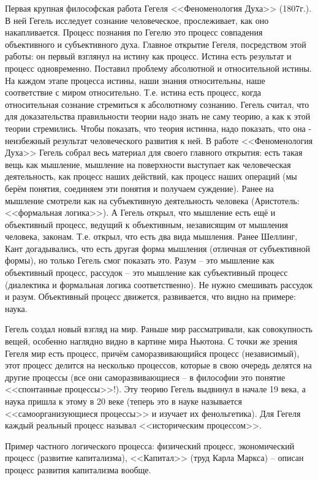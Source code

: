 Первая крупная философская работа Гегеля <<Феноменология Духа>> (1807г.). В ней Гегель исследует сознание человеческое, прослеживает, как оно накапливается. Процесс познания по Гегелю это процесс совпадения объективного и субъективного духа. Главное открытие Гегеля, посредством этой работы: он первый взглянул на истину как процесс. Истина есть результат и процесс одновременно. Поставил проблему абсолютной и относительной истины. На каждом этапе процесса истины, наши знания относительны, наше соответствие с миром относительно. Т.е. истина есть процесс, когда относительная сознание стремиться к абсолютному сознанию. Гегель считал, что для доказательства правильности теории надо знать не саму теорию, а как к этой теории стремились. Чтобы показать, что теория истинна, надо показать, что она - неизбежный результат человеческого развития к ней. В работе <<Феноменология Духа>> Гегель собрал весь материал для своего главного открытия: есть такая вещь как мышление, мышление на поверхности выступает как человеческая деятельность, как процесс наших действий, как процесс наших операций (мы берём понятия, соединяем эти понятия и получаем суждение). Ранее на мышление смотрели как на субъективную деятельность человека (Аристотель: <<формальная логика>>). А Гегель открыл, что мышление есть ещё и объективный процесс, ведущий к объективным, независящим от мышления человека, законам. Т.е. открыл, что есть два вида мышления. Ранее Шеллинг, Кант догадывались, что есть другая форма мышления (отличная от субъективной формы), но только Гегель смог показать это. Разум – это мышление как объективный процесс, рассудок – это мышление как субъективный процесс (диалектика и формальная логика соответственно). Не нужно смешивать рассудок и разум. Объективный процесс движется, развивается, что видно на примере: наука.

Гегель создал новый взгляд на мир. Раньше мир рассматривали, как совокупность вещей, особенно наглядно видно в картине мира Ньютона. С точки же зрения Гегеля мир есть процесс, причём саморазвивающийся процесс (независимый), этот процесс делится на несколько процессов, которые в свою очередь делятся на другие процессы (все они саморазвивающиеся – в философии это понятие <<спонтанные процессы>>!). Эту теорию Гегель выдвинул в начале 19 века, а наука пришла к этому в 20 веке (теперь это в науке называется <<самоорганизующиеся процессы>> и изучает их фенольгетика). Для Гегеля каждый реальный процесс называл <<историческим процессом>>.

Пример частного логического процесса: физический процесс, экономический процесс (развитие капитализма), <<Капитал>> (труд Карла Маркса) – описан процесс развития капитализма вообще.


